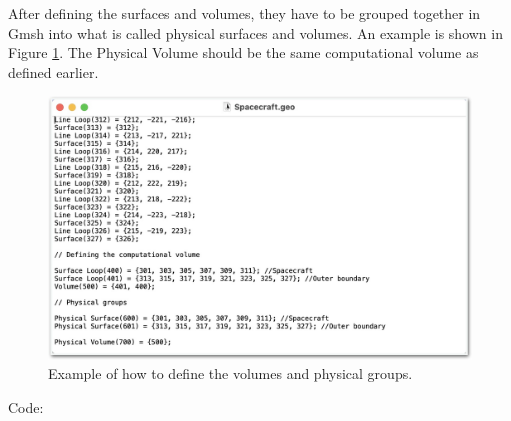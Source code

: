 \documentclass[a4paper, 12pt]{article}
\begin{document}
After defining the surfaces and volumes, they have to be grouped together in Gmsh into what is called physical surfaces and volumes. An example is shown in Figure \ref{A8}. The Physical Volume should be the same computational volume as defined earlier.\newpage

\begin{figure}[!ht]
    \centering
    \includegraphics[width=1\textwidth]{figA8.jpg}
    \caption{Example of how to define the volumes and physical groups.}
    \label{A8}
\end{figure}


Code:
\end{document}
